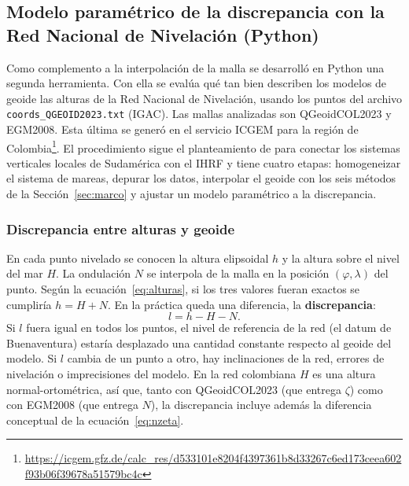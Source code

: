 \documentclass[11pt,letterpaper]{article}
\begin{document}
\subsection{Modelo paramétrico de la discrepancia con la Red Nacional de Nivelación (Python)}
\label{sec:parametrico}

Como complemento a la interpolación de la malla se desarrolló en Python una segunda
herramienta. Con ella se evalúa qué tan bien describen los modelos de geoide las alturas de
la Red Nacional de Nivelación, usando los puntos del archivo \texttt{coords\_QGEOID2023.txt}
(IGAC). Las mallas analizadas son QGeoidCOL2023 y EGM2008. Esta última se generó en el
servicio ICGEM \citep{ince2019} para la región de
Colombia\footnote{\url{https://icgem.gfz.de/calc_res/d533101e8204f4397361b8d33267c6ed173ceea602f93b06f39678a51579bc4c}}.
El procedimiento sigue el planteamiento de \citet{guimaraes2025} para conectar los sistemas
verticales locales de Sudamérica con el IHRF y tiene cuatro etapas: homogeneizar el sistema de
mareas, depurar los datos, interpolar el geoide con los seis métodos de la
Sección~\ref{sec:marco} y ajustar un modelo paramétrico a la discrepancia.

\subsubsection{Discrepancia entre alturas y geoide}
En cada punto nivelado se conocen la altura elipsoidal $h$ y la altura sobre el nivel del mar
$H$. La ondulación $N$ se interpola de la malla en la posición $(\varphi,\lambda)$ del punto.
Según la ecuación~\eqref{eq:alturas}, si los tres valores fueran exactos se cumpliría $h=H+N$.
En la práctica queda una diferencia, la \textbf{discrepancia}:
\begin{equation}
l = h - H - N .
\label{eq:discrepancia}
\end{equation}
Si $l$ fuera igual en todos los puntos, el nivel de referencia de la red (el datum de
Buenaventura) estaría desplazado una cantidad constante respecto al geoide del modelo. Si
$l$ cambia de un punto a otro, hay inclinaciones de la red, errores de nivelación o
imprecisiones del modelo. En la red colombiana $H$ es una altura normal-ortométrica, así que,
tanto con QGeoidCOL2023 (que entrega $\zeta$) como con EGM2008 (que entrega $N$), la
discrepancia incluye además la diferencia conceptual de la ecuación~\eqref{eq:nzeta}.
\end{document}
